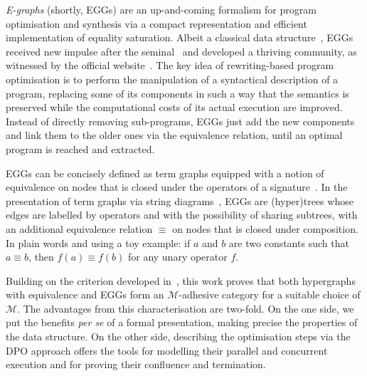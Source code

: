 \documentclass[a4paper,UKenglish,cleveref,pdftex,amsthm,thm-restate,numberwithinsect]{cas-sc}
\theoremstyle{plain}
\theoremstyle{definition}
\begin{document}
\emph{E-graphs} (shortly, EGGs) are an up-and-coming formalism for program optimisation and synthesis via a compact 
representation and efficient implementation of equality saturation. 
%
Albeit a classical data structure~\cite{DetlefsNS05}, EGGs received 
new impulse after the seminal~\cite{WillseyNWFTP21} and
developed a thriving community, as witnessed by the official website~\cite{eggs}.
%
The key idea of rewriting-based program optimisation is to perform the manipulation of a syntactical description 
of a program, replacing some of its components in such a way that the semantics is preserved while 
the computational costs of its actual execution are improved. Instead of directly removing sub-programs, EGGs just add the 
new components and link them to the older ones via the equivalence relation, until an optimal program is 
reached and extracted.

EGGs can be concisely defined as term graphs equipped with a notion of equivalence on nodes
that is closed under the operators of a signature~\cite[Section~4.2]{DetlefsNS05}.
In the presentation of term graphs via string diagrams~\cite{CastelnovoGM24}, EGGs are (hyper)trees 
whose edges are labelled by operators and with
the possibility of sharing subtrees, with an additional equivalence relation $\equiv$ on nodes that 
is closed under composition. In plain words and using a toy example:
if $a$ and $b$ are two constants such that $a \equiv b$, then $f(a) \equiv f(b)$ for any unary operator $f$.



Building on the criterion developed in~\cite{CastelnovoGM24}, this work proves that both hypergraphs with equivalence
and EGGs form an 
$\mathcal{M}$-adhesive category for a suitable choice of $\mathcal{M}$.
The advantages from this characterisation are two-fold. On the one side, 
we put the benefits \emph{per se} of a formal presentation, making precise the properties of the data structure. 
On the other side, describing the optimisation steps via the DPO approach
offers the tools for modelling their parallel and concurrent execution
and for proving their confluence and termination.
\end{document}
